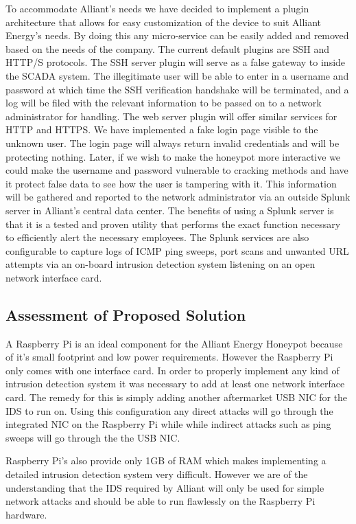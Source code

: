 To accommodate Alliant’s needs we have decided to implement a plugin architecture that allows for easy customization of the device to suit Alliant Energy's needs. By doing this any micro-service can be easily added and removed based on the needs of the company. The current default plugins are SSH and HTTP/S protocols. The SSH server plugin will serve as a false gateway to inside the SCADA 
system.  The illegitimate user will be able to enter in a username and password at which time the SSH verification handshake will be terminated,
and a log will be filed with the relevant information to be passed on to a network administrator for handling.  The web server plugin will
offer similar services for HTTP and HTTPS.  We have implemented a fake login page visible to the unknown user.  The
login page will always return invalid credentials and will be protecting nothing.  Later, if we wish to make the honeypot more
interactive we could make the username and password vulnerable to cracking methods and have it protect false data to see how the
user is tampering with it.  This information will be gathered and reported to the network administrator via an outside Splunk
server in Alliant’s central data center.  The benefits of using a Splunk server is that it is a tested and proven utility that performs
the exact function necessary to efficiently alert the necessary employees.  The Splunk services are also configurable to capture
logs of ICMP ping sweeps, port scans and unwanted URL attempts via an on-board intrusion detection system listening on an open network interface card.   

\subsection{Assessment of Proposed Solution}

A Raspberry Pi is an ideal component for the Alliant Energy Honeypot because of it's small footprint and low power requirements. However the Raspberry Pi only comes with one interface card. In order to properly implement any kind of intrusion detection system it was necessary to add at least one network interface card. The remedy for this is simply adding another aftermarket USB NIC for the IDS to run on. Using this configuration any direct attacks will go through the integrated NIC on the Raspberry Pi while while indirect attacks such as ping sweeps will go through the the USB NIC.

Raspberry Pi’s also provide only 1GB of RAM which makes implementing a detailed intrusion detection system very difficult.  However we are of the understanding that the IDS required by Alliant will only be used for simple network attacks and should be able to run flawlessly on the Raspberry Pi hardware.

